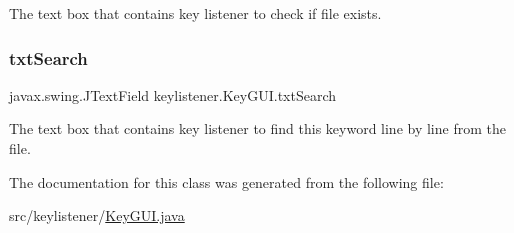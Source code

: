 The text box that contains key listener to check if file exists. \mbox{\label{classkeylistener_1_1_key_g_u_i_a12219fa977d21d4d00c2bdd827103a41}} 
\subsubsection{\texorpdfstring{txt\+Search}{txtSearch}}
{\footnotesize\ttfamily javax.\+swing.\+J\+Text\+Field keylistener.\+Key\+G\+U\+I.\+txt\+Search\hspace{0.3cm}{\ttfamily [private]}}

The text box that contains key listener to find this keyword line by line from the file. 

The documentation for this class was generated from the following file\+:\begin{DoxyCompactItemize}
\item 
src/keylistener/\hyperlink{_key_g_u_i_8java}{Key\+G\+U\+I.\+java}\end{DoxyCompactItemize}
